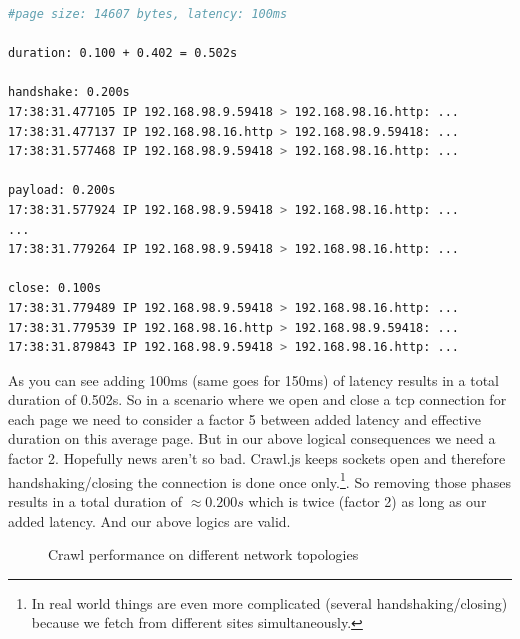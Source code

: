 \begin{lstlisting}[language=bash]
#page size: 14607 bytes, latency: 100ms

duration: 0.100 + 0.402 = 0.502s

handshake: 0.200s
17:38:31.477105 IP 192.168.98.9.59418 > 192.168.98.16.http: ...
17:38:31.477137 IP 192.168.98.16.http > 192.168.98.9.59418: ...
17:38:31.577468 IP 192.168.98.9.59418 > 192.168.98.16.http: ...

payload: 0.200s
17:38:31.577924 IP 192.168.98.9.59418 > 192.168.98.16.http: ...
...
17:38:31.779264 IP 192.168.98.9.59418 > 192.168.98.16.http: ...

close: 0.100s
17:38:31.779489 IP 192.168.98.9.59418 > 192.168.98.16.http: ...
17:38:31.779539 IP 192.168.98.16.http > 192.168.98.9.59418: ...
17:38:31.879843 IP 192.168.98.9.59418 > 192.168.98.16.http: ...
\end{lstlisting}

As you can see adding 100ms (same goes for 150ms) of latency results in a total duration of 0.502s. So in a scenario where we open and close a tcp connection for each page we need to consider a factor 5 between added latency and effective duration on this average page. But in our above logical consequences we need a factor 2. Hopefully news aren't so bad. Crawl.js keeps sockets open and therefore handshaking/closing the connection is done once only.\footnote{In real world things are even more complicated (several handshaking/closing) because we fetch from different sites simultaneously.}. So removing those phases results in a total duration of $ \approx 0.200s $ which is twice (factor 2) as long as our added latency. And our above logics are valid.

\begin{figure}
  \centering
  \caption{Crawl performance on different network topologies}
  \label{plot:exp_002}
\end{figure}


